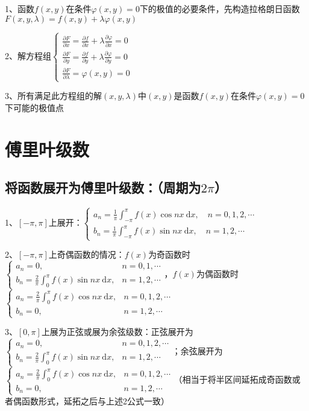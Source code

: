 1、函数$ f(x, y) $在条件$ \varphi(x, y)=0 $下的极值的必要条件，先构造拉格朗日函数$ F(x, y, \lambda)=f(x, y)+\lambda \varphi(x, y) $

2、解方程组$ \left\{\begin{array}{l} \frac{\partial F}{\partial x}=\frac{\partial f}{\partial x}+\lambda \frac{\partial \varphi}{\partial x}=0 \\ \frac{\partial F}{\partial y}=\frac{\partial f}{\partial y}+\lambda \frac{\partial \varphi}{\partial y}=0 \\ \frac{\partial F}{\partial \lambda}=\varphi(x, y)=0 \end{array}\right. $

3、所有满足此方程组的解$ (x, y, \lambda) $中$ (x, y) $是函数$ f(x, y) $在条件$ \varphi(x, y)=0 $下可能的极值点

\section{傅里叶级数}



\subsection{将函数展开为傅里叶级数：（周期为$ 2\pi $）}

1、$ [-\pi, \pi] $上展开：$ \left\{\begin{array}{l} a_{n}=\frac{1}{\pi} \int_{-\pi}^{\pi} f(x) \cos n x \mathrm{~d} x, \quad n=0,1,2, \cdots \\ b_{n}=\frac{1}{\pi} \int_{-\pi}^{\pi} f(x) \sin n x \mathrm{~d} x, \quad n=1,2, \cdots \end{array}\right. $

2、$ [-\pi, \pi] $上奇偶函数的情况：$ f(x) $为奇函数时$ \begin{cases}a_{n}=0, & n=0,1, \cdots \\ b_{n}=\frac{2}{\pi} \int_{0}^{\pi} f(x) \sin n x \mathrm{~d} x, & n=1,2, \cdots\end{cases} $，$ f(x) $为偶函数时$ \begin{cases}a_{n}=\frac{2}{\pi} \int_{0}^{\pi} f(x) \cos n x \mathrm{~d} x, & n=0,1,2, \cdots \\ b_{n}=0, & n=1,2, \cdots\end{cases} $

3、$ [0, \pi] $上展为正弦或展为余弦级数：正弦展开为$ \begin{cases}a_{n}=0, & n=0,1,2, \cdots \\ b_{n}=\frac{2}{\pi} \int_{0}^{\pi} f(x) \sin n x \mathrm{~d} x, & n=1,2, \cdots\end{cases} $；余弦展开为$ \begin{cases}a_{n}=\frac{2}{\pi} \int_{0}^{\pi} f(x) \cos n x \mathrm{~d} x, & n=0,1,2, \cdots \\ b_{n}=0, & n=1,2, \cdots\end{cases} $（相当于将半区间延拓成奇函数或者偶函数形式，延拓之后与上述2公式一致）



